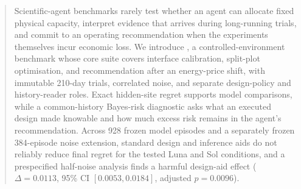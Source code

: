\begin{abstract}
Scientific-agent benchmarks rarely test whether an agent can allocate fixed physical
capacity, interpret evidence that arrives during long-running trials, and commit to an
operating recommendation when the experiments themselves incur economic loss. We introduce
\slowlab, a controlled-environment benchmark whose core suite covers interface calibration,
split-plot optimisation, and recommendation after an energy-price shift, with immutable
210-day trials, correlated noise, and separate design-policy and history-reader roles. Exact
hidden-site regret supports model comparisons, while a common-history Bayes-risk diagnostic
asks what an executed design made knowable and how much excess risk remains in the agent's
recommendation. Across 928 frozen model episodes and a separately frozen 384-episode noise
extension, standard design and inference aids do not reliably reduce final regret for the
tested Luna and Sol conditions, and a prespecified half-noise analysis finds a harmful
design-aid effect ($\Delta=0.0113$, 95\% CI $[0.0053,0.0184]$, adjusted $p=0.0096$).
\end{abstract}
